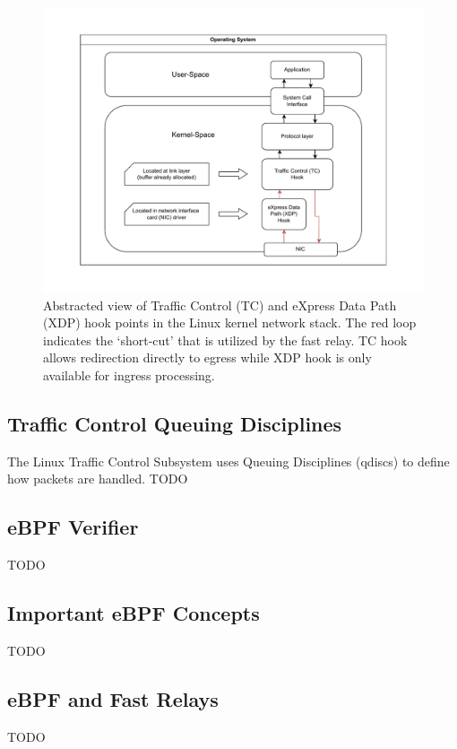 \begin{figure}[htbp]
    \centering
    \includegraphics[width=\textwidth]{figures/02_background/ebpf-hooks.drawio.pdf}
    \caption{Abstracted view of Traffic Control (TC) and eXpress Data Path (XDP) hook points
    in the Linux kernel network stack.
    The red loop indicates the `short-cut' that is utilized by the fast relay.
    TC hook allows redirection directly to egress while XDP hook is only available
    for ingress processing.
    }\label{fig:ebpf-hooks}
\end{figure}

\subsection{Traffic Control Queuing Disciplines}
The Linux Traffic Control Subsystem uses Queuing Disciplines (qdiscs) to define how packets
are handled. TODO

\subsection{eBPF Verifier}
TODO

\subsection{Important eBPF Concepts}
TODO

\subsection{eBPF and Fast Relays}
TODO

